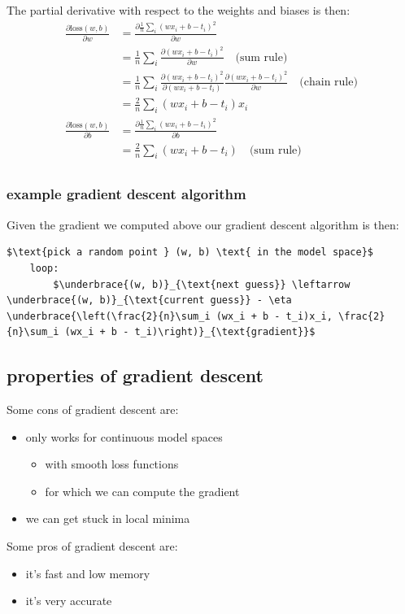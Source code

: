 \documentclass[12pt]{article}
\begin{document}
The partial derivative with respect to the weights and biases is then:
\begin{align*}
    \frac{\partial \text{loss}(w, b)}{\partial w} & = \frac{\partial \frac{1}{n} \sum_i (wx_i + b - t_i)^2}{\partial w} \\ 
    & = \frac{1}{n}\sum_i \frac{\partial (wx_i + b - t_i)^2}{\partial w} \quad \text{(sum rule)} \\
    & = \frac{1}{n}\sum_i \frac{\partial (wx_i + b - t_i)^2}{\partial (wx_i + b - t_i)}\frac{\partial (wx_i + b - t_i)^2}{\partial w} \quad \text{(chain rule)} \\ 
    & = \frac{2}{n}\sum_i (wx_i + b - t_i)x_i \\
    \frac{\partial \text{loss}(w, b)}{\partial b} & = \frac{\partial \frac{1}{n} \sum_i (wx_i + b - t_i)^2}{\partial b} \\
    & = \frac{2}{n}\sum_i (wx_i + b - t_i) \quad \text{(sum rule)} \\
\end{align*}
\subsubsection*{example gradient descent algorithm}
Given the gradient we computed above our gradient descent algorithm is then:
\begin{lstlisting}[caption=gradient descent algorithm example]
    $\text{pick a random point } (w, b) \text{ in the model space}$
    loop:
        $\underbrace{(w, b)}_{\text{next guess}} \leftarrow \underbrace{(w, b)}_{\text{current guess}} - \eta \underbrace{\left(\frac{2}{n}\sum_i (wx_i + b - t_i)x_i, \frac{2}{n}\sum_i (wx_i + b - t_i)\right)}_{\text{gradient}}$
\end{lstlisting}

\subsection{properties of gradient descent}
\begin{multicols}{2}
    Some cons of gradient descent are:
    \begin{itemize}[leftmargin=*, noitemsep]
        \item only works for continuous model spaces
        \begin{itemize}[leftmargin=*, noitemsep]
            \item with smooth loss functions
            \item for which we can compute the gradient
        \end{itemize}
        \item we can get stuck in local minima
    \end{itemize}
    \columnbreak
    Some pros of gradient descent are:
    \begin{itemize}[leftmargin=*, noitemsep]
        \item it's fast and low memory
        \item it's very accurate 
    \end{itemize}
    
\end{multicols}
\end{document}
